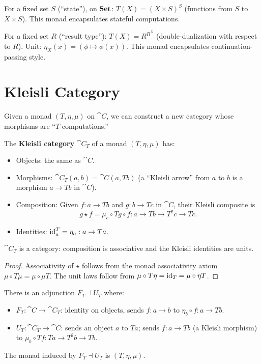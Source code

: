 \begin{example}
For a fixed set $S$ (``state''), on $\mathbf{Set}$: $T(X) = (X \times S)^S$ (functions from $S$ to $X \times S$). This monad encapsulates stateful computations.
\end{example}

\begin{example}
For a fixed set $R$ (``result type''): $T(X) = R^{R^X}$ (double-dualization with respect to $R$). Unit: $\eta_X(x) = (\phi \mapsto \phi(x))$. This monad encapsulates continuation-passing style.
\end{example}

\section{Kleisli Category}

Given a monad $(T, \eta, \mu)$ on $\cat{C}$, we can construct a new category whose morphisms are ``$T$-computations.''

\begin{definition}
The \textbf{Kleisli category} $\cat{C}_T$ of a monad $(T, \eta, \mu)$ has:
\begin{itemize}
  \item Objects: the same as $\cat{C}$.
  \item Morphisms: $\cat{C}_T(a,b) = \cat{C}(a, Tb)$ (a ``Kleisli arrow'' from $a$ to $b$ is a morphism $a \to Tb$ in $\cat{C}$).
  \item Composition: Given $f: a \to Tb$ and $g: b \to Tc$ in $\cat{C}$, their Kleisli composite is
  \[
    g \star f = \mu_c \circ Tg \circ f: a \to Tb \to T^2c \to Tc.
  \]
  \item Identities: $\mathrm{id}^T_a = \eta_a: a \to Ta$.
\end{itemize}
\end{definition}

\begin{proposition}
$\cat{C}_T$ is a category: composition is associative and the Kleisli identities are units.
\end{proposition}

\begin{proof}
Associativity of $\star$ follows from the monad associativity axiom $\mu \circ T\mu = \mu \circ \mu T$. The unit laws follow from $\mu \circ T\eta = \mathrm{id}_T = \mu \circ \eta T$.
\end{proof}

\begin{proposition}
There is an adjunction $F_T \dashv U_T$ where:
\begin{itemize}
  \item $F_T: \cat{C} \to \cat{C}_T$: identity on objects, sends $f: a \to b$ to $\eta_b \circ f: a \to Tb$.
  \item $U_T: \cat{C}_T \to \cat{C}$: sends an object $a$ to $Ta$; sends $f: a \to Tb$ (a Kleisli morphism) to $\mu_b \circ Tf: Ta \to T^2b \to Tb$.
\end{itemize}
The monad induced by $F_T \dashv U_T$ is $(T, \eta, \mu)$.
\end{proposition}

